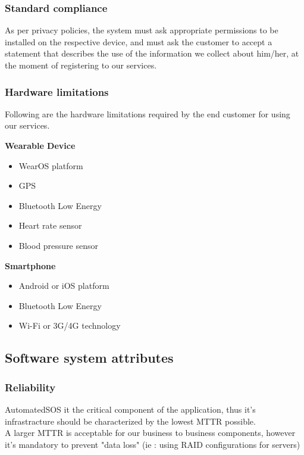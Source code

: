 \documentclass[../main.tex]{subfiles}
\begin{document}
\subsubsection{Standard compliance}

As per privacy policies, the system must ask appropriate permissions to be installed on the respective device, and must ask the customer to accept a statement that describes the use of the information we collect about him/her, at the moment of registering to our services.

\subsubsection{Hardware limitations}

Following are the hardware limitations required by the end customer for using our services.

\vspace*{8mm}
\begin{minipage}{\textwidth}
{\bf Wearable Device}
\begin{itemize}
	\item WearOS platform
	\item GPS
	\item Bluetooth Low Energy
	\item Heart rate sensor
	\item Blood pressure sensor
\end{itemize}
\end{minipage}

\vspace*{8mm}
\begin{minipage}{\textwidth}
{\bf Smartphone}
\begin{itemize}
	\item Android or iOS platform
	\item Bluetooth Low Energy
	\item Wi-Fi or 3G/4G technology
\end{itemize}
\end{minipage}

\subsection{Software system attributes}

\subsubsection{Reliability}
   AutomatedSOS it the critical component of the application, thus it's infrastracture should be characterized by the lowest MTTR possible.\\
   A larger MTTR is acceptable for our business to business components, however it's mandatory to prevent "data loss" (ie : using RAID configurations for servers)   
\end{document}
